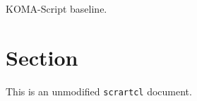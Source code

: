 \documentclass{scrartcl}
\begin{document}
KOMA-Script baseline.

\section{Section}
This is an unmodified \texttt{scrartcl} document.
\end{document}
